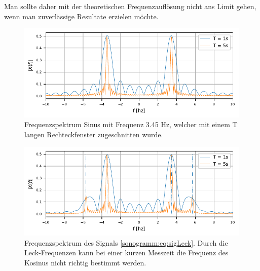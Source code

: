 Man sollte daher mit der theoretischen Frequenzauflösung nicht ans Limit gehen, wenn man
zuverlässige Resultate erzielen möchte.

\begin{figure}
    \centering
    \includegraphics{papers/sonogramm/images/RectWinHarmEx.pdf}
    \caption{Frequenzspektrum Sinus mit Frequenz 3.45 Hz, welcher mit einem T langen 
    Rechteckfenster zugeschnitten wurde.
    \label{sonogramm:leakageDemo}
    }
\end{figure}

\begin{figure}
    \centering
    \includegraphics{papers/sonogramm/images/twohamrrect.pdf}
    \caption{Frequenzspektrum des Signals \eqref{sonogramm:eq:sigLeck}.
    Durch die Leck-Frequenzen kann bei einer kurzen Messzeit die Frequenz des Kosinus 
    nicht richtig bestimmt werden.
    \label{sonogramm:leakageDemo2}
    }
\end{figure}

